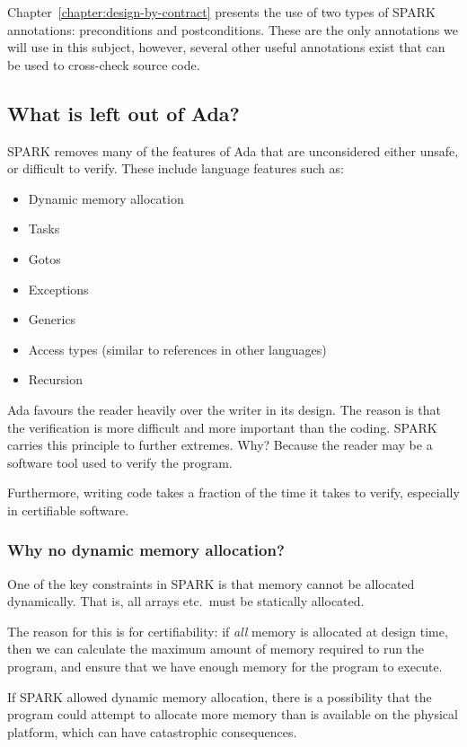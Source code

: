Chapter~\ref{chapter:design-by-contract} presents the use of two types of SPARK annotations: preconditions and postconditions. These are the only annotations we will use in this subject, however, several other useful annotations exist that can be used to cross-check source code.

\subsection{What is left out of Ada?}

SPARK removes many of the features of Ada that are unconsidered either unsafe, or difficult to verify. These include language features such as:

\begin{itemize}
  \item Dynamic memory allocation
  \item Tasks
  \item Gotos
  \item Exceptions
  \item Generics
  \item Access types (similar to references in other languages)
  \item Recursion
\end{itemize}

Ada favours the reader heavily over the writer in its design. The reason is that the verification is more difficult and more important than the coding. SPARK carries this principle to further extremes. Why? Because the reader may be a software tool used to verify the program.

Furthermore, writing code takes a fraction of the time it takes to verify, especially in certifiable software.

\subsubsection*{Why no dynamic memory allocation?}

One of the key constraints in SPARK is that memory cannot be allocated dynamically. That is, all arrays etc.\ must be statically allocated.

The reason for this is for certifiability: if \emph{all} memory is allocated at design time, then we can calculate the maximum amount of memory required to run the program, and ensure that we have enough memory for the program to execute.

If SPARK allowed dynamic memory allocation, there is a possibility that the program could attempt to allocate more memory than is available on the physical platform, which can have catastrophic consequences.

